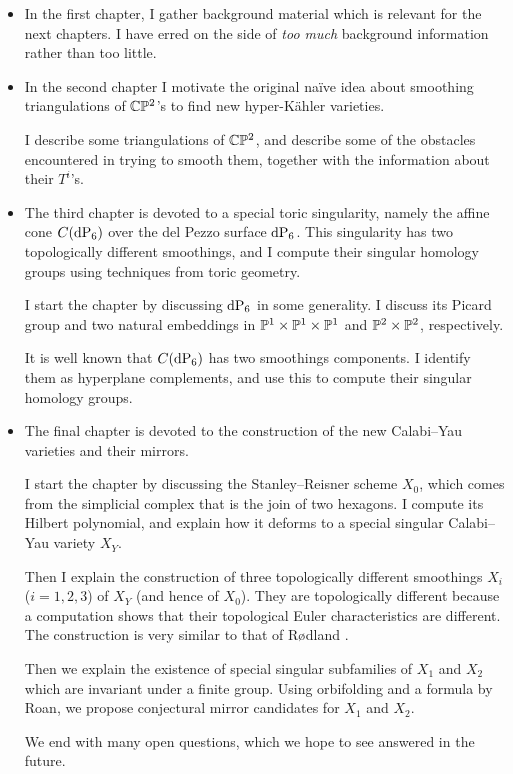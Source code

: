 \begin{itemize}
	\item  In the first chapter, I gather background material which is relevant for the next chapters. I have erred on the side of \emph{too much} background information rather than too little. 

\item In the second chapter I motivate the original naïve idea about smoothing triangulations of $\C \P^2$'s to find new hyper-Kähler varieties.

I describe some triangulations of $\C \P^2$, and describe some of the obstacles encountered in trying to smooth them, together with the information about their $T^i$'s.

\item The third chapter is devoted to a special toric singularity, namely the affine cone $C(\dP6)$ over the del Pezzo surface $\dP6$. This singularity has two topologically different smoothings, and I compute their singular homology groups using techniques from toric geometry.

I start the chapter by discussing $\dP6$ in some generality. I discuss its Picard group and two natural embeddings in $\P^1 \times \P^1 \times \P^1$ and $\P^2 \times \P^2$, respectively.

It is well known that $C(\dP6)$ has two smoothings components. I identify them as hyperplane complements, and use this to compute their singular homology groups.

\item The final chapter is devoted to the construction of the new Calabi--Yau varieties and their mirrors.

I start the chapter by discussing the Stanley--Reisner scheme $X_0$, which comes from the simplicial complex that is the join of two hexagons. I compute its Hilbert polynomial, and explain how it deforms to a special singular Calabi--Yau variety $X_Y$.

Then I explain the construction of three topologically different smoothings $X_i$ ($i=1,2,3$) of $X_Y$ (and hence of $X_0$). They are topologically different because a \MM computation shows that their topological Euler characteristics are different. The construction is very similar to that of Rødland \cite{rodland_pfaffian}.

Then we explain the existence of special singular subfamilies of $X_1$ and $X_2$ which are invariant under a finite group. Using orbifolding and a formula by Roan, we propose conjectural mirror candidates for $X_1$ and $X_2$.

We end with many open questions, which we hope to see answered in the future.


\end{itemize}

